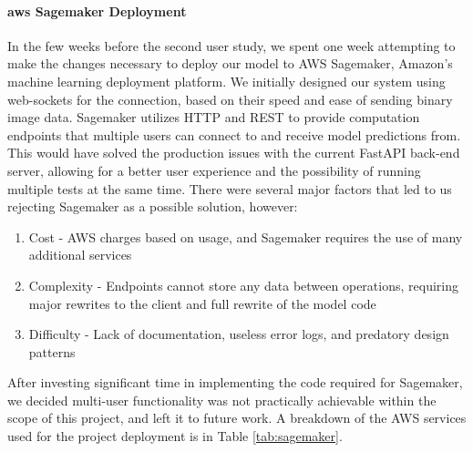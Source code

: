 \documentclass[thesis]{fputhesis}
\begin{document}
\begin{body}
\paragraph{\acrshort{aws} Sagemaker Deployment}
In the few weeks before the second user study, we spent one week attempting to make the changes necessary to deploy our model to AWS Sagemaker, Amazon's machine learning deployment platform. We initially designed our system using web-sockets for the connection, based on their speed and ease of sending binary image data. Sagemaker utilizes HTTP and REST to provide computation endpoints that multiple users can connect to and receive model predictions from. This would have solved the production issues with the current FastAPI back-end server, allowing for a better user experience and the possibility of running multiple tests at the same time. There were several major factors that led to us rejecting Sagemaker as a possible solution, however:
\begin{enumerate}
    \item Cost - AWS charges based on usage, and Sagemaker requires the use of many additional services
    \item Complexity - Endpoints cannot store any data between operations, requiring major rewrites to the client and full rewrite of the model code
    \item Difficulty - Lack of documentation, useless error logs, and predatory design patterns
\end{enumerate}
After investing significant time in implementing the code required for Sagemaker, we decided multi-user functionality was not practically achievable within the scope of this project, and left it to future work. A breakdown of the AWS services used for the project deployment is in Table \ref{tab:sagemaker}.


\end{body}
\end{document}
